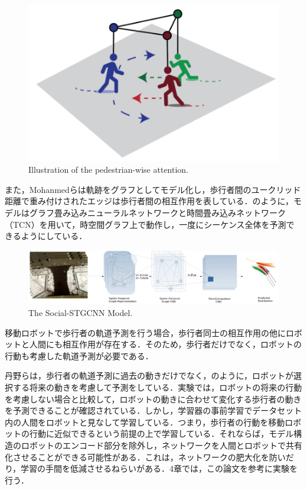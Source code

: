\begin{figure}[hbtp]
     \centering
    \includegraphics[keepaspectratio, scale=0.4]
         {images/s-bigat.png}
    \caption{Illustration of the pedestrian-wise attention.\protect\footnotemark[3]}
    \label{Fig:s-bigat}
\end{figure}

\protect{}

また，Mohanmedら\cite{s-stgcnn}は軌跡をグラフとしてモデル化し，歩行者間のユークリッド距離で重み付けされたエッジは歩行者間の相互作用を表している．のように，モデルはグラフ畳み込みニューラルネットワークと時間畳み込みネットワーク（TCN）を用いて，時空間グラフ上で動作し，一度にシーケンス全体を予測できるようにしている．

\begin{figure}[hbtp]
     \centering
    \includegraphics[keepaspectratio, scale=0.39]
         {images/s-stgcnn.png}
    \caption{The Social-STGCNN Model.\protect\footnotemark[4]}
    \label{Fig:s-stgcnn}
\end{figure}

\protect{}

\newpage

移動ロボットで歩行者の軌道予測を行う場合，歩行者同士の相互作用の他にロボットと人間にも相互作用が存在する．そのため，歩行者だけでなく，ロボットの行動も考慮した軌道予測が必要である．

丹野ら\cite{si2023-tanno}は，歩行者の軌道予測に過去の動きだけでなく，のように，ロボットが選択する将来の動きを考慮して予測をしている．実験では，ロボットの将来の行動を考慮しない場合と比較して，ロボットの動きに合わせて変化する歩行者の動きを予測できることが確認されている．しかし，学習器の事前学習でデータセット内の人間をロボットと見なして学習している．つまり，歩行者の行動を移動ロボットの行動に近似できるという前提の上で学習している．それならば，モデル構造のロボットのエンコード部分を除外し，ネットワークを人間とロボットで共有化させることができる可能性がある．これは，ネットワークの肥大化を防いだり，学習の手間を低減させるねらいがある．4章では，この論文を参考に実験を行う．

